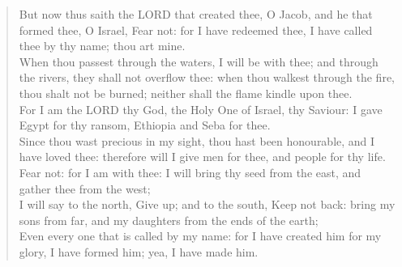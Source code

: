 \documentclass[MAIN]{subfiles}
\begin{document}
\begin{verse}
But now thus saith the {\hge LORD} that created thee, O Jacob, and he that formed thee, O Israel, Fear not: for I have redeemed thee, I have called thee by thy name; thou art mine.\\
When thou passest through the waters, I will be with thee; and through the rivers, they shall not overflow thee: when thou walkest through the fire, thou shalt not be burned; neither shall the flame kindle upon thee.\\
For I am the {\hge LORD} thy God, the Holy One of Israel, thy Saviour: I gave Egypt for thy ransom, Ethiopia and Seba for thee.\\
Since thou wast precious in my sight, thou hast been honourable, and I have loved thee: therefore will I give men for thee, and people for thy life.\\
Fear not: for I am with thee: I will bring thy seed from the east, and gather thee from the west;\\
I will say to the north, Give up; and to the south, Keep not back: bring my sons from far, and my daughters from the ends of the earth;\\
Even every one that is called by my name: for I have created him for my glory, I have formed him; yea, I have made him.\\
\end{verse}
\end{document}
